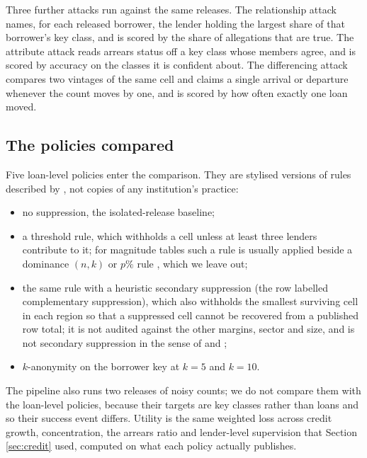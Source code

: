 \documentclass[11pt,a4paper]{article}
\theoremstyle{plain}
\theoremstyle{definition}
\theoremstyle{definition}
\theoremstyle{plain}
\begin{document}
Three further attacks run against the same releases. The relationship attack names,
for each released borrower, the lender holding the largest share of that borrower's
key class, and is scored by the share of allegations that are true. The attribute
attack reads arrears status off a key class whose members agree, and is scored by
accuracy on the classes it is confident about. The differencing attack compares two
vintages of the same cell and claims a single arrival or departure whenever the
count moves by one, and is scored by how often exactly one loan moved.

\subsection{The policies compared}\label{sec:eval-policies}

Five loan-level policies enter the comparison. They are stylised versions of rules
described by \citet{hundepool2012}, not copies of any institution's practice:

\begin{itemize}
\item no suppression, the isolated-release baseline;
\item a threshold rule, which withholds a cell unless at least three lenders
  contribute to it; for magnitude tables such a rule is usually applied beside a
  dominance $(n,k)$ or $p\%$ rule \citep[ch.~4]{hundepool2012}, which we leave out;
\item the same rule with a heuristic secondary suppression (the row labelled
  complementary suppression), which also withholds the smallest surviving cell in
  each region so that a suppressed cell cannot be recovered from a published row
  total; it is not audited against the other margins, sector and size, and is not
  secondary suppression in the sense of \citet{cox1980} and
  \citet{fischetti2001};
\item $k$-anonymity on the borrower key at $k = 5$ and $k = 10$.
\end{itemize}

The pipeline also runs two releases of noisy counts; we do not compare them with
the loan-level policies, because their targets are key classes rather than loans
and so their success event differs. Utility is the same weighted loss across
credit growth, concentration, the arrears ratio and lender-level supervision that
Section \ref{sec:credit} used, computed on what each policy actually publishes.

\begingroup\let\small\footnotesize\setlength{\tabcolsep}{4pt}\endgroup
\end{document}
